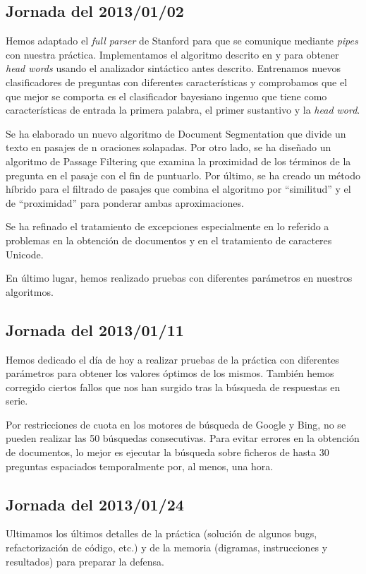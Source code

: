 \documentclass[12pt,a4paper,titlepage]{article}
\begin{document}
\subsection{Jornada del 2013/01/02}
Hemos adaptado el \emph{full parser} de Stanford para que se comunique mediante \emph{pipes} con nuestra práctica. Implementamos el algoritmo descrito en \cite{tesis:qc} y \cite{paper:qc} para obtener \emph{head words} usando el analizador sintáctico antes descrito. Entrenamos nuevos clasificadores de preguntas con diferentes características y comprobamos que el que mejor se comporta es el clasificador bayesiano ingenuo que tiene como características de entrada la primera palabra, el primer sustantivo y la \emph{head word}.

Se ha elaborado un nuevo algoritmo de Document Segmentation que divide un texto en pasajes de n oraciones solapadas. Por otro lado, se ha diseñado un algoritmo de Passage Filtering que examina la proximidad de los términos de la pregunta en el pasaje con el fin de puntuarlo. Por último, se ha creado un método híbrido para el filtrado de pasajes que combina el algoritmo por ``similitud'' y el de ``proximidad'' para ponderar ambas aproximaciones.

Se ha refinado el tratamiento de excepciones especialmente en lo referido a problemas en la obtención de documentos y en el tratamiento de caracteres Unicode.

En último lugar, hemos realizado pruebas con diferentes parámetros en nuestros algoritmos.

\subsection{Jornada del 2013/01/11}
Hemos dedicado el día de hoy a realizar pruebas de la práctica con diferentes parámetros para obtener los valores óptimos de los mismos. También hemos corregido ciertos fallos que nos han surgido tras la búsqueda de respuestas en serie.

Por restricciones de cuota en los motores de búsqueda de Google y Bing, no se pueden realizar las 50 búsquedas consecutivas. Para evitar errores en la obtención de documentos, lo mejor es ejecutar la búsqueda sobre ficheros de hasta 30 preguntas espaciados temporalmente por, al menos, una hora.

\subsection{Jornada del 2013/01/24}
Ultimamos los últimos detalles de la práctica (solución de algunos bugs, refactorización de código, etc.) y de la memoria (digramas, instrucciones y resultados) para preparar la defensa.
\end{document}
